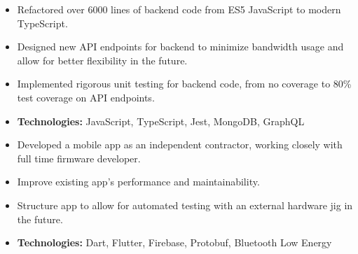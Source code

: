 \documentclass[10pt,a4paper,ragged2e]{resume-openfont}
\begin{document}

\makecvheader
{}

\begin{itemize}
  \item Refactored over 6000 lines of backend code from ES5 JavaScript to modern TypeScript.
  \item Designed new API endpoints for backend to minimize bandwidth usage and allow for better flexibility in the future.
  \item Implemented rigorous unit testing for backend code, from no coverage to 80\% test coverage on API endpoints.
  \item \textbf{Technologies:} JavaScript, TypeScript, Jest, MongoDB, GraphQL
\end{itemize}
\divider\small

\begin{itemize}
  \item Developed a mobile app as an independent contractor, working closely with full time firmware developer.
  \item Improve existing app's performance and maintainability.
  \item Structure app to allow for automated testing with an external hardware jig in the future.
  \item \textbf{Technologies:} Dart, Flutter, Firebase, Protobuf, Bluetooth Low Energy
\end{itemize}

\end{document}
